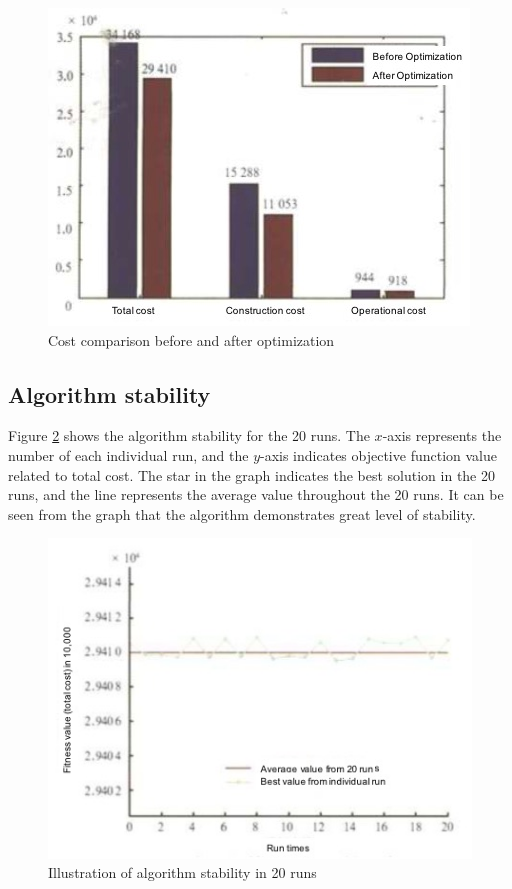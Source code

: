 \begin{figure}[h!]
	\begin{center}
		\includegraphics[width=0.8\linewidth]{sections/figure4.jpg}
		\caption{Cost comparison before and after optimization}
		\label{fig:fig4}
	\end{center}
\end{figure}

\subsection{Algorithm stability}
Figure \ref{fig:fig5} shows the algorithm stability for the 20 runs.
The $x$-axis represents the number of each individual run, and the $y$-axis indicates objective function value related to total cost.
The star in the graph indicates the best solution in the 20 runs, and the line represents the average value throughout the 20 runs.
It can be seen from the graph that the algorithm demonstrates great level of stability.

\begin{figure}[h!]
	\begin{center}
		\includegraphics[width=0.8\linewidth]{sections/figure5.jpg}
		\caption{Illustration of algorithm stability in 20 runs}
		\label{fig:fig5}
	\end{center}
\end{figure}